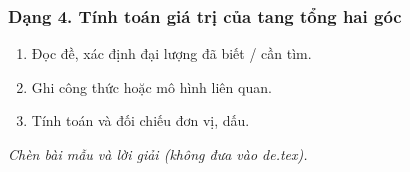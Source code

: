 \subsubsection{Dạng 4. Tính toán giá trị của tang tổng hai góc}
\begin{phuongphap}
\begin{enumerate}
\item Đọc đề, xác định đại lượng đã biết / cần tìm.
\item Ghi công thức hoặc mô hình liên quan.
\item Tính toán và đối chiếu đơn vị, dấu.
\end{enumerate}
\end{phuongphap}
\begin{vidumau}
\textit{Chèn bài mẫu và lời giải (không đưa vào de.tex).}
\end{vidumau}


